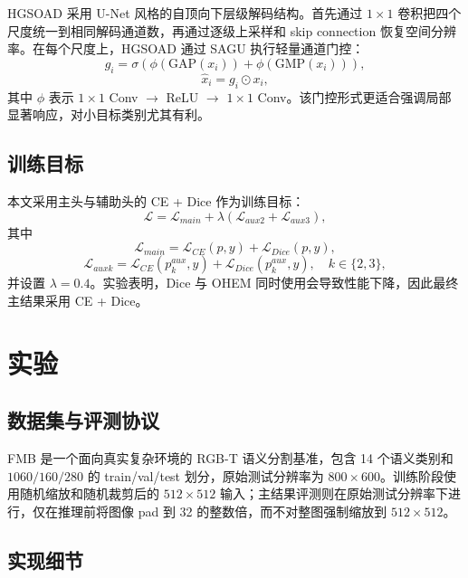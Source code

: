 \documentclass[UTF8,10pt,twocolumn]{ctexart}
\begin{document}
HGSOAD 采用 U-Net 风格的自顶向下层级解码结构。首先通过 $1\times1$ 卷积把四个尺度统一到相同解码通道数，再通过逐级上采样和 skip connection 恢复空间分辨率。在每个尺度上，HGSOAD 通过 SAGU 执行轻量通道门控：
\begin{equation}
g_i=\sigma\left(\phi(\mathrm{GAP}(x_i))+\phi(\mathrm{GMP}(x_i))\right),
\end{equation}
\begin{equation}
\hat{x}_i = g_i \odot x_i,
\end{equation}
其中 $\phi$ 表示 $1\times1$ Conv $\rightarrow$ ReLU $\rightarrow$ $1\times1$ Conv。该门控形式更适合强调局部显著响应，对小目标类别尤其有利。

\subsection{训练目标}

本文采用主头与辅助头的 CE + Dice 作为训练目标：
\begin{equation}
\mathcal{L}=\mathcal{L}_{main} + \lambda \left(\mathcal{L}_{aux2}+\mathcal{L}_{aux3}\right),
\end{equation}
其中
\begin{equation}
\mathcal{L}_{main}=\mathcal{L}_{CE}(p,y)+\mathcal{L}_{Dice}(p,y),
\end{equation}
\begin{equation}
\mathcal{L}_{auxk}=\mathcal{L}_{CE}(p_k^{aux},y)+\mathcal{L}_{Dice}(p_k^{aux},y), \quad k\in\{2,3\},
\end{equation}
并设置 $\lambda=0.4$。实验表明，Dice 与 OHEM 同时使用会导致性能下降，因此最终主结果采用 CE + Dice。

\section{实验}

\subsection{数据集与评测协议}

FMB 是一个面向真实复杂环境的 RGB-T 语义分割基准，包含 14 个语义类别和 $1060/160/280$ 的 train/val/test 划分，原始测试分辨率为 $800\times600$。训练阶段使用随机缩放和随机裁剪后的 $512\times512$ 输入；主结果评测则在原始测试分辨率下进行，仅在推理前将图像 pad 到 32 的整数倍，而不对整图强制缩放到 $512\times512$。

\subsection{实现细节}
\end{document}
